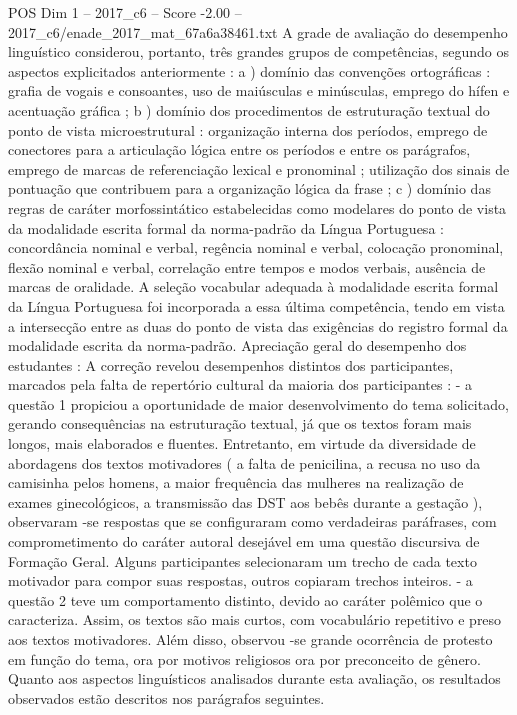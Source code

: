 \begin{textsample}{POS Dim 1 – 2017\_c6 – Score -2.00 – 2017\_c6/enade\_2017\_mat\_67a6a38461.txt}
A grade de avaliação do desempenho linguístico considerou, portanto, três grandes grupos de competências, segundo os aspectos explicitados anteriormente : a ) domínio das convenções ortográficas : grafia de vogais e consoantes, uso de maiúsculas e minúsculas, emprego do hífen e acentuação gráfica ; b ) domínio dos procedimentos de estruturação textual do ponto de vista microestrutural : organização interna dos períodos, emprego de conectores para a articulação lógica entre os períodos e entre os parágrafos, emprego de marcas de referenciação lexical e pronominal ; utilização dos sinais de pontuação que contribuem para a organização lógica da frase ; c ) domínio das regras de caráter morfossintático estabelecidas como modelares do ponto de vista da modalidade escrita formal da norma-padrão da Língua Portuguesa : concordância nominal e verbal, regência nominal e verbal, colocação pronominal, flexão nominal e verbal, correlação entre tempos e modos verbais, ausência de marcas de oralidade.
A seleção vocabular adequada à modalidade escrita formal da Língua Portuguesa foi incorporada a essa última competência, tendo em vista a intersecção entre as duas do ponto de vista das exigências do registro formal da modalidade escrita da norma-padrão.
Apreciação geral do desempenho dos estudantes : A correção revelou desempenhos distintos dos participantes, marcados pela falta de repertório cultural da maioria dos participantes : - a questão 1 propiciou a oportunidade de maior desenvolvimento do tema solicitado, gerando consequências na estruturação textual, já que os textos foram mais longos, mais elaborados e fluentes.
Entretanto, em virtude da diversidade de abordagens dos textos motivadores ( a falta de penicilina, a recusa no uso da camisinha pelos homens, a maior frequência das mulheres na realização de exames ginecológicos, a transmissão das DST aos bebês durante a gestação ), observaram -se respostas que se configuraram como verdadeiras paráfrases, com comprometimento do caráter autoral desejável em uma questão discursiva de Formação Geral.
Alguns participantes selecionaram um trecho de cada texto motivador para compor suas respostas, outros copiaram trechos inteiros. - a questão 2 teve um comportamento distinto, devido ao caráter polêmico que o caracteriza.
Assim, os textos são mais curtos, com vocabulário repetitivo e preso aos textos motivadores.
Além disso, observou -se grande ocorrência de protesto em função do tema, ora por motivos religiosos ora por preconceito de gênero.
Quanto aos aspectos linguísticos analisados durante esta avaliação, os resultados observados estão descritos nos parágrafos seguintes.

\end{textsample}
